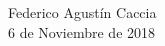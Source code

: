 \documentclass[11pt,a4paper,sans]{moderncv}        %
\begin{document}
\vspace{\fill}
\hspace{0.7\linewidth}
\begin{minipage}{0.3\linewidth}
	\begin{center}
		Federico Agustín Caccia\\
		6 de Noviembre de 2018
		\bigskip
	\end{center}
\end{minipage}




\end{document}
